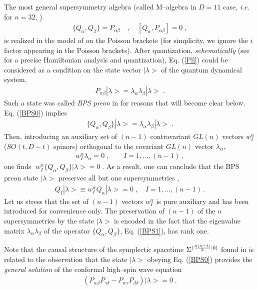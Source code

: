 \documentclass[a4paper,11pt]{article}
\begin{document}
The most general supersymmetry algebra 
(called M--algebra in $D=11$ case, {\it i.e.} for $n=32$, \cite{M-alg}) 
\begin{eqnarray}\label{QQZ} 
    \{ Q_\alpha, Q_\beta\}=P_{\alpha\beta}\quad , 
   \quad [Q_\alpha, P_{\alpha\beta}]=0
    \; ,
\end{eqnarray}
is realized in the model of \cite{BL98} on the Poisson brackets 
(for simplicity, we ignore the $i$ factor appearing in the Poisson 
brackets). 
After quantization, {\sl schematically} (see \cite{BL98,BLS99} for 
a precise Hamiltonian analysis and quantization),  
Eq.  (\ref{Pll}) could be considered as 
a condition  on the state vector $|\lambda>$ of the quantum dynamical system, 
\begin{eqnarray}\label{BPS0} 
P_{\alpha\beta}|\lambda>= \lambda_{\alpha}\lambda_{\beta}|\lambda> \; .
\end{eqnarray}
Such a state was called {\sl BPS preon} in \cite{BPS01} 
for reasons that will become clear below. Eq.  (\ref{BPS0}) implies  
\begin{eqnarray}\label{BPS1} 
\{ Q_\alpha, Q_\beta \} |\lambda> = \lambda_\alpha \lambda_\beta |\lambda> \; .
\end{eqnarray}
Then, introducing an auxiliary set of $(n-1)$  contravariant $GL(n)$ vectors 
$w^{\alpha}_I$ ($SO(t,D-t)$ spinors)  orthogonal to 
the covariant $GL(n)$ vector $\lambda_\alpha$,  
\begin{eqnarray}\label{mul} 
w^{\alpha}_I \lambda_\alpha = 0\; , \qquad 
I=1, \ldots , (n-1)\, , 
\end{eqnarray}
one finds 
$\; w^{\alpha}_I 
\{ Q_\alpha, Q_\beta \} |\lambda> = 0 \;$. 
As a result, one can conclude that the BPS preon state $|\lambda>$ 
preserves all but one supersymmetries \cite{BPS01},  
\begin{eqnarray}\label{BPS3} 
Q_I |\lambda> \equiv w^{\alpha}_I Q_\alpha |\lambda> 
= 0 \; , \quad I=1, \ldots , (n-1)\, .
\end{eqnarray}
Let us stress that the set of $(n-1)$ vectors  $w^{\alpha}_I$ is pure 
auxiliary and has been introduced  for convenience only. 
The preservation of $(n-1)$ of the $n$ supersymmetries by the state 
$|\lambda>$ is encoded in the fact that the eigenvalue matrix 
$\lambda_\alpha \lambda_\beta$ 
of the operator $\{ Q_\alpha, Q_\beta \}$, Eq. (\ref{BPS1}), has rank one. 


Note that the causal structure of the symplectic spacetime 
$\Sigma^{({n(n-1)\over 2}|0)}$ found in \cite{V01c}  
is related to the observation that the state $|\lambda >$ obeying 
Eq. (\ref{BPS0}) provides 
the {\sl general solution} 
of the conformal high--spin wave equation \cite{V01s}
\begin{eqnarray}\label{BPS4} 
(P_{\alpha\beta}P_{\gamma\delta} - P_{\alpha\gamma}P_{\beta\delta})
|\lambda>= 0 \; .
\end{eqnarray}
\end{document}
